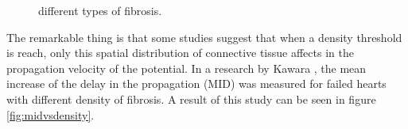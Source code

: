 \documentclass[letterpaper, twoside]{article}     	    %
\begin{document}
\begin{figure}[H]
\centering
{}
\caption{different types of fibrosis.}
\end{figure}

The remarkable thing is that some studies \cite{Comtois2011IEEE} suggest that when a density threshold is reach, only this spatial distribution of connective tissue affects in the propagation velocity of the potential. In a research by Kawara \cite{Kawara2001Circ}, the mean increase of the delay in the propagation (MID) was measured for failed hearts with different density of fibrosis. A result of this study can be seen in figure \ref{fig:midvsdensity}.
\end{document}
